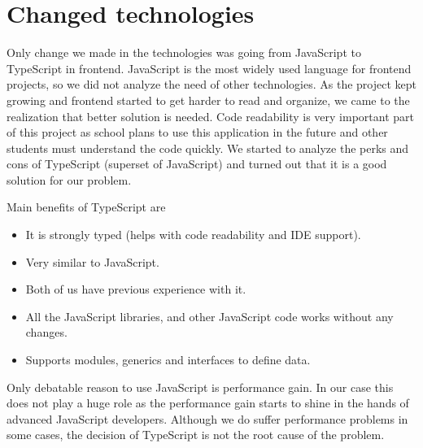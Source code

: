 \section{Changed technologies}\label{sec:changed-technologies}
Only change we made in the technologies was going from JavaScript to TypeScript in frontend.
JavaScript is the most widely used language for frontend projects, so we did not analyze the need of other technologies.
As the project kept growing and frontend started to get harder to read and organize, we came to the realization that better solution is needed.
Code readability is very important part of this project as school plans to use this application in the future and other students must understand the code quickly.
We started to analyze the perks and cons of TypeScript (superset of JavaScript) and turned out that it is a good solution for our problem.

Main benefits of TypeScript are
\begin{itemize}
    \item It is strongly typed (helps with code readability and IDE support).
    \item Very similar to JavaScript.
    \item Both of us have previous experience with it.
    \item All the JavaScript libraries, and other JavaScript code works without any changes.
    \item Supports modules, generics and interfaces to define data.
\end{itemize}

Only debatable reason to use JavaScript is performance gain.
In our case this does not play a huge role as the performance gain starts to shine in the hands of advanced JavaScript developers.
Although we do suffer performance problems in some cases, the decision of TypeScript is not the root cause of the problem.



